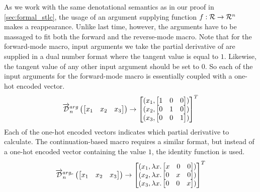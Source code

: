   As we work with the same denotational semantics as in our proof in \cref{sec:formal_stlc}, the usage of an argument supplying function $f : \mathcal{R} \rightarrow \mathcal{R}^n$ makes a reappearance.
  Unlike last time, however, the arguments have to be massaged to fit both the forward and the reverse-mode macro.
  Note that for the forward-mode macro, input arguments we take the partial derivative of are supplied in a dual number format where the tangent value is equal to $1$.
  Likewise, the tangent value of any other input argument should be set to $0$.
  So each of the input arguments for the forward-mode macro is essentially coupled with a one-hot encoded vector.
  \begin{equation*}
    \overrightarrow{\mathcal{D}}^{arg}_n\left(
    \begin{bmatrix}
      x_1 & x_2 & x_3 \\
    \end{bmatrix}\right)
    \to
    \begin{bmatrix}
      (x_1,
        \begin{bmatrix}
          1 & 0 & 0 \\
        \end{bmatrix}) \\
      (x_2,
        \begin{bmatrix}
          0 & 1 & 0 \\
        \end{bmatrix}) \\
      (x_3,
        \begin{bmatrix}
          0 & 0 & 1 \\
        \end{bmatrix}) \\
    \end{bmatrix}^T
  \end{equation*}
  Each of the one-hot encoded vectors indicates which partial derivative to calculate.
  The continuation-based macro requires a similar format, but instead of a one-hot encoded vector containing the value $1$, the identity function is used.
  \begin{equation*}
    \overrightarrow{\mathcal{D}}^{arg_c}_n\left(
    \begin{bmatrix}
      x_1 & x_2 & x_3 \\
    \end{bmatrix}\right)
    \to
    \begin{bmatrix}
      (x_1,
        \lambda x.
        \begin{bmatrix}
          x & 0 & 0 \\
        \end{bmatrix}) \\
      (x_2,
        \lambda x.
        \begin{bmatrix}
          0 & x & 0 \\
        \end{bmatrix}) \\
      (x_3,
        \lambda x.
        \begin{bmatrix}
          0 & 0 & x \\
        \end{bmatrix}) \\
    \end{bmatrix}^T
  \end{equation*}

